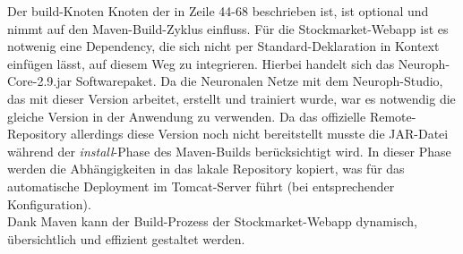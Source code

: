 Der build-Knoten Knoten der in Zeile 44-68 beschrieben ist, ist optional und nimmt auf den Maven-Build-Zyklus einfluss. Für die Stockmarket-Webapp ist es notwenig eine Dependency, die sich nicht per Standard-Deklaration in Kontext einfügen lässt, auf diesem Weg zu integrieren. Hierbei handelt sich das Neuroph-Core-2.9.jar Softwarepaket. Da die Neuronalen Netze mit dem Neuroph-Studio, das mit dieser Version arbeitet, erstellt und trainiert wurde, war es notwendig die gleiche Version in der Anwendung zu verwenden. Da das offizielle Remote-Repository allerdings diese Version noch nicht bereitstellt musste die JAR-Datei während der \emph{install}-Phase des Maven-Builds berücksichtigt wird. In dieser Phase werden die Abhängigkeiten in das lakale Repository kopiert, was für das automatische Deployment im Tomcat-Server führt (bei entsprechender Konfiguration). \\
Dank Maven kann der Build-Prozess der Stockmarket-Webapp dynamisch, übersichtlich und effizient gestaltet werden.   

